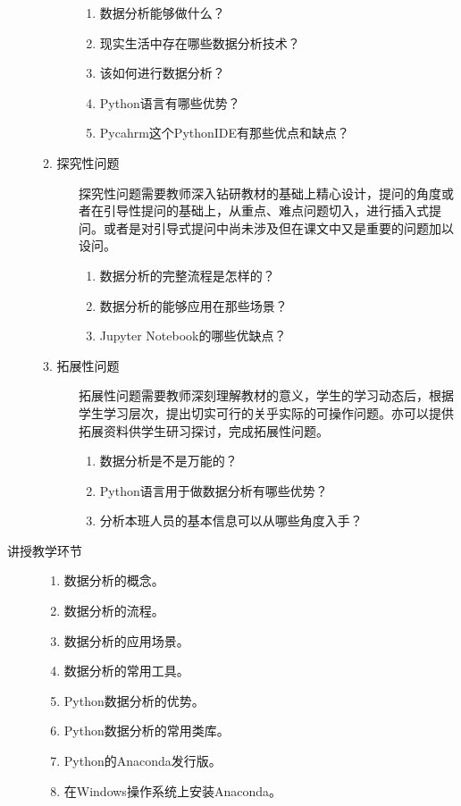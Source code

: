 \documentclass[12pt,a4paper,openany,cap]{ctexbook}
\begin{document}
\begin{description}
\begin{description}
\begin{enumerate}
\item  数据分析能够做什么？
\item\label{item:51}  现实生活中存在哪些数据分析技术？
\item\label{item:52}  该如何进行数据分析？
\item\label{item:53}  Python语言有哪些优势？
\item\label{item:54}  Pycahrm这个PythonIDE有那些优点和缺点？
\end{enumerate}
\item[2. 探究性问题] 
探究性问题需要教师深入钻研教材的基础上精心设计，提问的角度或者在引导性提问的基础上，从重点、难点问题切入，进行插入式提问。或者是对引导式提问中尚未涉及但在课文中又是重要的问题加以设问。
\begin{enumerate}
\item  数据分析的完整流程是怎样的？
\item\label{item:55}  数据分析的能够应用在那些场景？
\item\label{item:56}      Jupyter Notebook的哪些优缺点？
\end{enumerate}
\item[ 3. 拓展性问题] 
拓展性问题需要教师深刻理解教材的意义，学生的学习动态后，根据学生学习层次，提出切实可行的关乎实际的可操作问题。亦可以提供拓展资料供学生研习探讨，完成拓展性问题。
\begin{enumerate}
\item      数据分析是不是万能的？
\item\label{item:57}  Python语言用于做数据分析有哪些优势？
\item\label{item:58}      分析本班人员的基本信息可以从哪些角度入手？
\end{enumerate}
\end{description}
\item[讲授教学环节]
  \begin{minipage}[t]{0.8\linewidth}
    \begin{enumerate}
    \item     数据分析的概念。
\item\label{item:59}  数据分析的流程。
\item\label{item:60}  数据分析的应用场景。
\item\label{item:61}  数据分析的常用工具。
\item\label{item:62}  Python数据分析的优势。
\item\label{item:63}  Python数据分析的常用类库。
\item\label{item:64}  Python的Anaconda发行版。
\item\label{item:65}  在Windows操作系统上安装Anaconda。

\end{enumerate}
\end{minipage}
\end{description}
\end{document}
